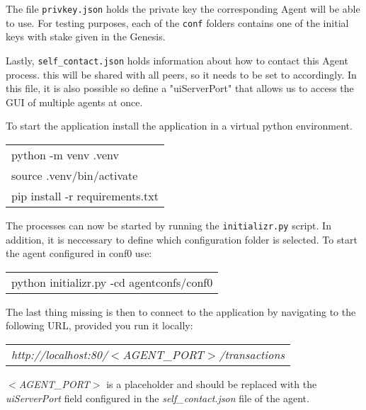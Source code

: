 The file \texttt{privkey.json} holds the private key the corresponding Agent will be able to use. For testing purposes, each of the \texttt{conf} folders contains one of the initial keys with stake given in the Genesis.

Lastly, \texttt{self\_contact.json} holds information about how to contact this Agent process. this will be shared with all peers, so it needs to be set to accordingly. In this file, it is also possible so define a "uiServerPort" that allows us to access the GUI of multiple agents at once. 

To start the application install the application in a virtual python environment.

\vspace{2mm}
\begin{tabular}{l}
	python -m venv .venv \\ 
	source .venv/bin/activate \\
	pip install -r requirements.txt \\

\end{tabular}

\vspace{2mm}

The processes can now be started by running the \texttt{initializr.py} script. In addition, it is neccessary to define which configuration folder is selected. To start the agent configured in conf0 use:

\vspace{2mm}
\begin{tabular}{l}
	python initializr.py -cd agentconfs/conf0
\end{tabular}
\vspace{2mm}

The last thing missing is then to connect to the application by navigating to the following URL, provided you run it locally:

\vspace{2mm}
\begin{tabular}{l}
	\textit{http://localhost:80/$<$AGENT\_PORT$>$/transactions}
\end{tabular}
\vspace{2mm}

\textit{$<$AGENT\_PORT$>$} is a placeholder and should be replaced with the \textit{uiServerPort} field configured in the \textit{self\_contact.json} file of the agent.

